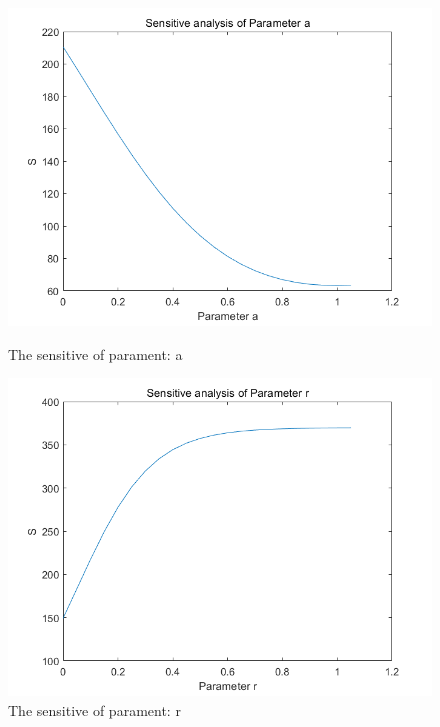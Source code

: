 \documentclass{mcmthesis}
\numberwithin{figure}{section}
\numberwithin{table}{section}
\numberwithin{equation}{section}
\begin{document}
\begin{figure}[htbp]
	\centering
	\begin{minipage}[t]{0.48\linewidth}
	\centering
	\includegraphics[width=0.7\linewidth]{./figures/Sen_a.png}
	\caption{The sensitive of parament: a}
	\label{F 8.1}
\end{minipage}\hfill
	\begin{minipage}[t]{0.48\linewidth}
\centering
\includegraphics[width=0.7\linewidth]{./figures/sen_r.png}
\caption{The sensitive of parament: r
		}
\label{F 8.2}
\end{minipage}\hfill
\end{figure}
\end{document}

